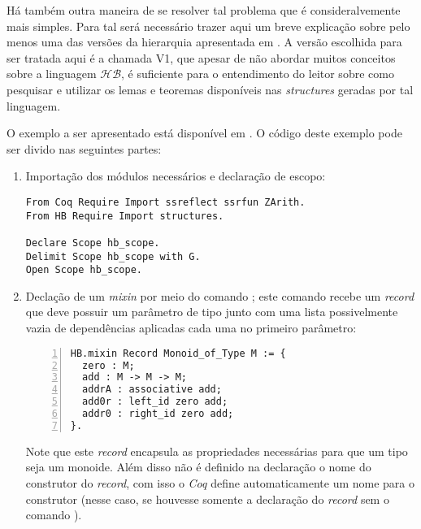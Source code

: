 {{Há também outra maneira de se resolver tal problema que é consideralvemente mais simples. Para tal será necessário trazer aqui um breve explicação sobre pelo menos uma das versões da hierarquia apresentada em \cite{cohen:hal-02478907}. A versão escolhida para ser tratada aqui é a chamada V1, que apesar de não abordar muitos conceitos sobre a linguagem $\mathcal{HB}$, é suficiente para o entendimento do leitor sobre como pesquisar e utilizar os lemas e teoremas disponíveis nas \textit{structures} geradas por tal linguagem.

O exemplo a ser apresentado está disponível em \cite{mathcomp-hb-v1}. O código deste exemplo pode ser divido nas seguintes partes:
    \begin{enumerate}
        \item Importação dos módulos necessários e declaração de escopo:
        \begin{lstlisting}[language=coq, frame=single, tabsize=1]
From Coq Require Import ssreflect ssrfun ZArith.
From HB Require Import structures.

Declare Scope hb_scope.
Delimit Scope hb_scope with G.
Open Scope hb_scope.
        \end{lstlisting}
    
        \item \label{item:mixin-monoid} Declação de um \textit{mixin} por meio do comando ; este comando recebe um \textit{record} que deve possuir um parâmetro de tipo  junto com uma lista possivelmente vazia de dependências 
        aplicadas cada uma no primeiro parâmetro:
            \begin{lstlisting}[language=coq, frame=single, tabsize=1, numbers=left]
HB.mixin Record Monoid_of_Type M := {
  zero : M;
  add : M -> M -> M;
  addrA : associative add;
  add0r : left_id zero add;
  addr0 : right_id zero add;
}.
            \end{lstlisting}
        Note que este \textit{record} encapsula as propriedades necessárias para que um tipo  seja um monoide. Além disso não é definido na declaração o nome do construtor do \textit{record}, com isso o \textit{Coq} define automaticamente um nome para o construtor (nesse caso, se houvesse somente a declaração do \textit{record} sem o comando  ).


\end{enumerate}}}
